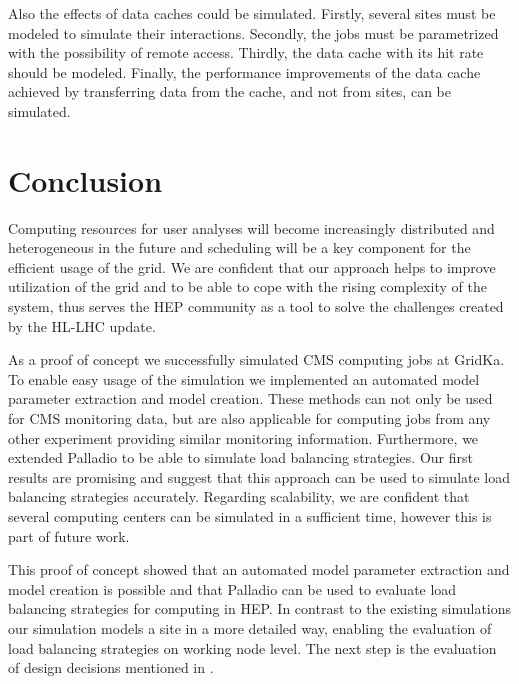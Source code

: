\documentclass{webofc}
\begin{document}
Also the effects of data caches could be simulated. Firstly, several sites must be modeled to simulate their interactions. Secondly, the jobs must be parametrized with the possibility of remote access. Thirdly, the data cache with its hit rate should be modeled. Finally, the performance improvements of the data cache achieved by transferring data from the cache, and not from sites, can be simulated.
\section{Conclusion}
\label{conlusion}

Computing resources for user analyses will become increasingly distributed and heterogeneous in the future and 
scheduling will be a key component for the efficient usage of the grid. We are confident that our approach helps to improve utilization of the grid and to be able to cope with the rising complexity of the system, thus serves the HEP community as a tool to solve the challenges created by the HL-LHC update.

As a proof of concept we successfully simulated CMS computing jobs at GridKa. To enable easy usage of the simulation we implemented an automated model parameter extraction and model creation. These methods can not only be used for CMS monitoring data, but are also applicable for computing jobs from any other experiment providing similar monitoring information. Furthermore, we extended Palladio to be able to simulate load balancing strategies. Our first results are promising and suggest that this approach can be used to simulate load balancing strategies accurately. Regarding scalability, we are confident that several computing centers can be simulated in a sufficient time, however this is part of future work.

This proof of concept showed that an automated model parameter extraction and model creation is possible and that Palladio can be used to evaluate load balancing strategies for computing in HEP. In contrast to the existing simulations our simulation models a site in a more detailed way, enabling the evaluation of load balancing strategies on working node level. The next step is the evaluation of design decisions mentioned in .





\end{document}
